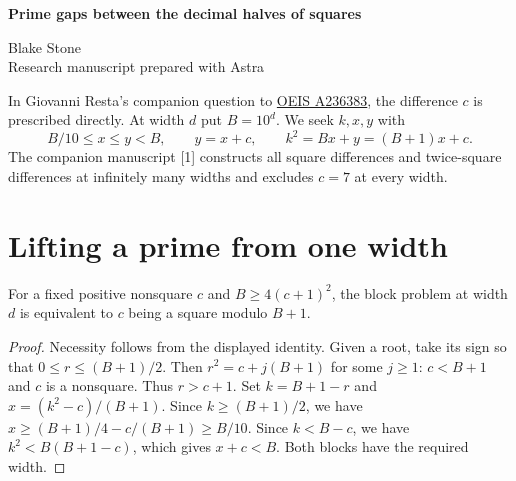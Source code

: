 \documentclass[11pt,letterpaper]{article}
\begin{document}
\thispagestyle{plain}
\begin{center}
{\LARGE\bfseries Prime gaps between the decimal halves of squares\par}
\vspace{0.4em}Blake Stone\\{\small Research manuscript prepared with Astra}
\end{center}
\begin{abstract}
For a set of primes of relative density $227568931/268435456$, every difference $pm^2$, $m\ge1$, occurs between equal-length decimal halves of a square at infinitely many widths. A quadratic Gauss sum constructs a witness at each sufficiently large width in an explicit geometric progression. Each of the differences $3,6,24,30$ occurs at only one width. For the differences from $0$ through $1000$, we give 860 witnesses and prove 67 differences impossible at every width.
\end{abstract}

In Giovanni Resta's companion question to \href{https://oeis.org/A236383}{OEIS A236383}, the difference $c$ is prescribed directly. At width $d$ put $B=10^d$. We seek $k,x,y$ with
\[
 B/10\le x\le y<B,\qquad y=x+c,\qquad k^2=Bx+y=(B+1)x+c.
\]
The companion manuscript [1] constructs all square differences and twice-square differences at infinitely many widths and excludes $c=7$ at every width.

\section{Lifting a prime from one width}
\begin{lemma}\label{blocks}
For a fixed positive nonsquare $c$ and $B\ge4(c+1)^2$, the block problem at width $d$ is equivalent to $c$ being a square modulo $B+1$.
\end{lemma}
\begin{proof}
Necessity follows from the displayed identity. Given a root, take its sign so that $0\le r\le(B+1)/2$. Then $r^2=c+j(B+1)$ for some $j\ge1$: $c<B+1$ and $c$ is a nonsquare. Thus $r>c+1$. Set $k=B+1-r$ and $x=(k^2-c)/(B+1)$. Since $k\ge(B+1)/2$, we have $x\ge (B+1)/4-c/(B+1)\ge B/10$. Since $k<B-c$, we have $k^2<B(B+1-c)$, which gives $x+c<B$. Both blocks have the required width.
\end{proof}
\end{document}
